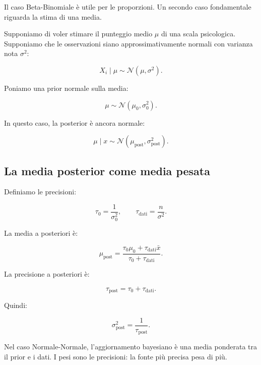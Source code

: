 \documentclass[
  italian,
  letterpaper,
  a4paper,
  11pt,
  open=any]{scrbook}
\theoremstyle{plain}
\theoremstyle{definition}
\theoremstyle{definition}
\theoremstyle{remark}
\begin{document}
Il caso Beta-Binomiale è utile per le proporzioni. Un secondo caso
fondamentale riguarda la stima di una media.

Supponiamo di voler stimare il punteggio medio \(\mu\) di una scala
psicologica. Supponiamo che le osservazioni siano approssimativamente
normali con varianza nota \(\sigma^2\):

\[
X_i \mid \mu \sim \mathcal{N}(\mu, \sigma^2).
\]

Poniamo una prior normale sulla media:

\[
\mu \sim \mathcal{N}(\mu_0, \sigma_0^2).
\]

In questo caso, la posterior è ancora normale:

\[
\mu \mid x \sim \mathcal{N}(\mu_{\text{post}}, \sigma^2_{\text{post}}).
\]

\subsection{La media posterior come media
pesata}\label{la-media-posterior-come-media-pesata}

Definiamo le precisioni:

\[
\tau_0 = \frac{1}{\sigma_0^2},
\qquad
\tau_{\text{dati}} = \frac{n}{\sigma^2}.
\]

La media a posteriori è:

\[
\mu_{\text{post}} =
\frac{\tau_0\mu_0 + \tau_{\text{dati}}\bar{x}}
{\tau_0 + \tau_{\text{dati}}}.
\]

La precisione a posteriori è:

\[
\tau_{\text{post}} = \tau_0 + \tau_{\text{dati}}.
\]

Quindi:

\[
\sigma^2_{\text{post}} = \frac{1}{\tau_{\text{post}}}.
\]

\begin{tcolorbox}[enhanced jigsaw, arc=.35mm, bottomrule=.15mm, bottomtitle=1mm, breakable, colback=white, colbacktitle=quarto-callout-important-color!10!white, colframe=quarto-callout-important-color-frame, coltitle=black, left=2mm, leftrule=.75mm, opacityback=0, opacitybacktitle=0.6, rightrule=.15mm, title=\textcolor{quarto-callout-important-color}{\faExclamation}\hspace{0.5em}{Importante}, titlerule=0mm, toprule=.15mm, toptitle=1mm]

Nel caso Normale-Normale, l'aggiornamento bayesiano è una media
ponderata tra il prior e i dati. I pesi sono le precisioni: la fonte più
precisa pesa di più.

\end{tcolorbox}
\end{document}
